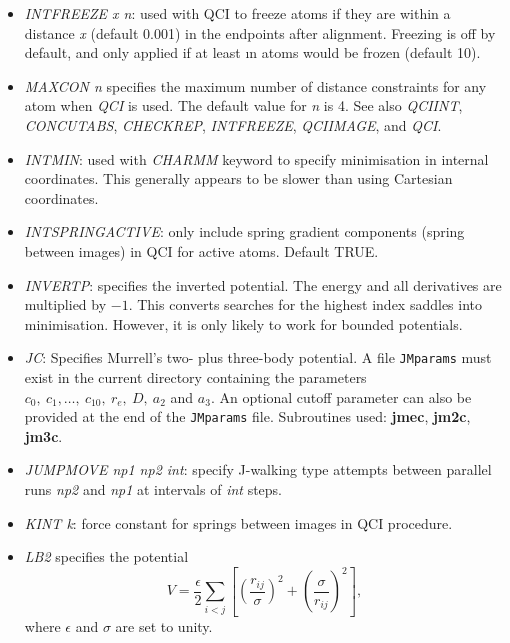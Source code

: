 \documentclass[12pt,a4paper,dvips]{article}
\begin{document}
\begin{itemize}
\item{\it INTFREEZE x n}: used with QCI to freeze atoms if they are within a distance
{\it x} (default 0.001) in the endpoints after alignment. 
Freezing is off by default, and only applied if at least {\i n} atoms would be
frozen (default 10).

\item{\it MAXCON n\/} specifies the maximum number of distance constraints for any atom
when {\it QCI\/} is used. The default value for {\it n\/} is 4.
See also
{\it QCIINT\/},
{\it CONCUTABS\/},
{\it CHECKREP\/},
{\it INTFREEZE\/},
{\it QCIIMAGE\/}, and
{\it QCI\/}.

\item{\it INTMIN}: used with {\it CHARMM} keyword to specify minimisation in internal 
coordinates. This generally appears to be
slower than using Cartesian coordinates.

\item{\it INTSPRINGACTIVE}: only include spring gradient components (spring between images) in
QCI for active atoms. Default TRUE.

\item{\it INVERTP}: specifies the inverted potential. The energy and all derivatives
are multiplied by $-1$. 
This converts searches for the highest index saddles into minimisation. 
However, it is only likely to work for bounded potentials.

\item{\it JC}: Specifies Murrell's two- plus three-body
potential.\cite{murrellm90,murrellr90,alderzijmr91,eggenjlm92,fengjm93}
A file {\tt JMparams} must
exist in the current directory containing the parameters $c_0,\ c_1,\ldots,\ c_{10},\ r_e,\
D,\ a_2$ and $a_3$. An optional cutoff parameter can also be provided at the end of the
{\tt JMparams} file.
Subroutines used: {\bf jmec}, {\bf jm2c}, {\bf jm3c}.

\item {\it JUMPMOVE np1 np2 int\/}: specify J-walking type attempts between parallel runs {\it np2\/}
and {\it np1\/} at intervals of {\it int\/} steps.

\item {\it KINT k\/}: force constant for springs between images in QCI procedure.

\item {\it LB2} specifies the potential\cite{LB299a,LB299b,LB204}
\begin{equation}
V = \frac{\epsilon}{2} \sum_{i<j} \left[ \left(\frac{r_{ij}}{\sigma}\right)^2+
\left(\frac{\sigma}{r_{ij}}\right)^2 \right],
\end{equation}
where $\epsilon$ and $\sigma$ are set to unity.


\end{itemize}
\end{document}
